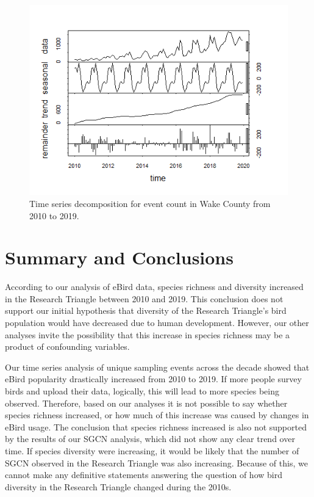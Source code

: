 \documentclass[
  12pt,
]{article}
\begin{document}
\begin{figure}
\centering
\includegraphics{./Output/Wake_event_ts_decomp.png}
\caption{Time series decomposition for event count in Wake County from
2010 to 2019.}
\end{figure}

\newpage

\hypertarget{summary-and-conclusions}{%
\section{Summary and Conclusions}\label{summary-and-conclusions}}

According to our analysis of eBird data, species richness and diversity
increased in the Research Triangle between 2010 and 2019. This
conclusion does not support our initial hypothesis that diversity of the
Research Triangle's bird population would have decreased due to human
development. However, our other analyses invite the possibility that
this increase in species richness may be a product of confounding
variables.

Our time series analysis of unique sampling events across the decade
showed that eBird popularity drastically increased from 2010 to 2019. If
more people survey birds and upload their data, logically, this will
lead to more species being observed. Therefore, based on our analyses it
is not possible to say whether species richness increased, or how much
of this increase was caused by changes in eBird usage. The conclusion
that species richness increased is also not supported by the results of
our SGCN analysis, which did not show any clear trend over time. If
species diversity were increasing, it would be likely that the number of
SGCN observed in the Research Triangle was also increasing. Because of
this, we cannot make any definitive statements answering the question of
how bird diversity in the Research Triangle changed during the 2010s.
\end{document}
